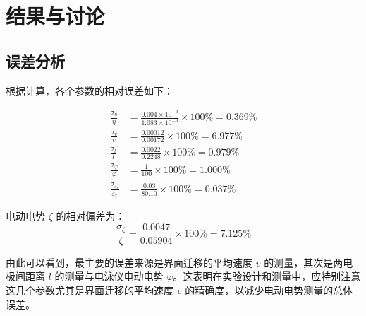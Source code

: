 \section{结果与讨论}

\subsection{误差分析}

根据计算，各个参数的相对误差如下：

$$
\begin{aligned}
\frac{\sigma_\eta}{\eta} & =\frac{0.004 \times 10^{-3}}{1.083 \times 10^{-3}} \times 100 \% = 0.369 \% \\
\frac{\sigma_v}{v} & =\frac{0.00012}{0.00172} \times 100 \% = 6.977 \% \\
\frac{\sigma_l}{l} & =\frac{0.0022}{0.2248} \times 100 \% = 0.979 \% \\
\frac{\sigma_{\varphi}}{\varphi} & =\frac{1}{100} \times 100 \% = 1.000 \% \\
\frac{\sigma_{\varepsilon_r}}{\varepsilon_r} & =\frac{0.03}{80.10} \times 100 \% = 0.037 \%
\end{aligned}
$$

电动电势 \(\zeta\) 的相对偏差为：
$$
\frac{\sigma_\zeta}{\zeta}=\frac{0.0047}{0.05904} \times 100 \% = 7.125 \%
$$

由此可以看到，最主要的误差来源是界面迁移的平均速度 \(v\) 的测量，其次是两电极间距离 \(l\) 的测量与电泳仪电动电势 \(
\varphi\)。这表明在实验设计和测量中，应特别注意这几个参数尤其是界面迁移的平均速度 \(v\) 的精确度，以减少电动电势测量的总体误差。

